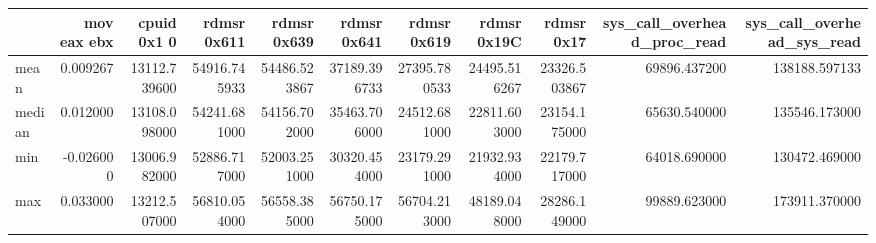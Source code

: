 \begin{tabular}{lrrrrrrrrrr}
\toprule
 & mov eax ebx & cpuid 0x1 0 & rdmsr 0x611 & rdmsr 0x639 & rdmsr 0x641 & rdmsr 0x619 & rdmsr 0x19C & rdmsr 0x17 & sys_call_overhead_proc_read & sys_call_overhead_sys_read \\
\midrule
mean & 0.009267 & 13112.739600 & 54916.745933 & 54486.523867 & 37189.396733 & 27395.780533 & 24495.516267 & 23326.503867 & 69896.437200 & 138188.597133 \\
median & 0.012000 & 13108.098000 & 54241.681000 & 54156.702000 & 35463.706000 & 24512.681000 & 22811.603000 & 23154.175000 & 65630.540000 & 135546.173000 \\
min & -0.026000 & 13006.982000 & 52886.717000 & 52003.251000 & 30320.454000 & 23179.291000 & 21932.934000 & 22179.717000 & 64018.690000 & 130472.469000 \\
max & 0.033000 & 13212.507000 & 56810.054000 & 56558.385000 & 56750.175000 & 56704.213000 & 48189.048000 & 28286.149000 & 99889.623000 & 173911.370000 \\
\bottomrule
\end{tabular}

